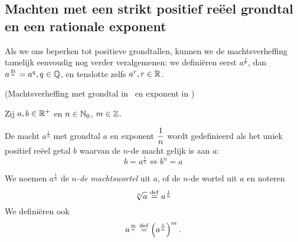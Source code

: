 \documentclass{ximera}
\begin{document}
\subsection{Machten met een strikt positief re\"eel grondtal en een rationale exponent}

Als we ons beperken tot positieve grondtallen, kunnen we de machtsverheffing tamelijk eenvoudig nog verder veralgemenen: we definiëren eerst $a^{\frac1n}$, dan $a^{\frac mn} = a^q, q\in\mathbb{Q}$, en tenslotte zelfs $a^r, r\in\mathbb{R}$.
 

\begin{definition}(Machtsverheffing met grondtal in \Rplus\ en exponent in \Q) \label{def:machten met rationale exponent}
	
	Zij $a,b\in\mathbb{R}^+$ en $n\in\mathbb{N}_0$, $m\in\mathbb{Z}$. 
	
	De macht $a^{\frac{1}{n}}$ met grondtal $a$ en exponent $\displaystyle\frac{1}{n}$ wordt
	gedefinieerd als het uniek positief re\"eel getal $b$ waarvan de $n$-de
	macht gelijk is aan $a$:
	\[b = a^\frac 1n \iff b^n = a\]

	
	We noemen $a^{\frac{1}{n}}$ de \textit{$n$-de machtswortel }uit $a$, of de $n$-de wortel uit $a$ en noteren
	\[
		\sqrt[n]{a} \overset{\mathrm{def}}{=} a^\frac 1n
	\]
	We definiëren ook
	\[a^{\frac{m}{n}}\overset{\mathrm{def}}{=} \left(a^{\frac{1}{n}}\right)^m.\]
\end{definition}
\end{document}
